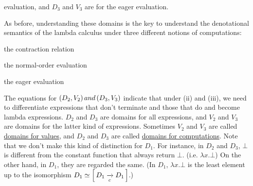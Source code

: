 \begin{enumcirc}
	evaluation, and $D_3$ and $V_3$ are for the eager evaluation.
	\item
	As before, understanding these domains is the key to understand the
	denotational semantics of the lambda calculus under three different notions of
	computations:
	\begin{enumrm}
		\item
		the contraction relation
		\item
		the normal-order evaluation
		\item
		the eager evaluation
	\end{enumrm}
	The equations for $\left( D_2, V_2 \right) and \left( D_3, V_3 \right)$ indicate that under
	(ii) and (iii), we need to differentiate expressions that don't terminate and
	those that do and become lambda expressions.
	$D_2$ and $D_3$ are domains for all expressions, and $V_2$ and $V_3$ are domains
	for the latter kind of expressions.
	Sometimes $V_2$ and $V_3$ are called \ul{domains for values}, and $D_2$ and
	$D_3$ are called \ul{domains for computations}.
	Note that we don't make this kind of distinction for $D_1$.
	For instance, in $D_2$ and $D_3$, $\bot$ is different from the constant
	function that always return $\bot$. (i.e. $\lambda x. \bot$)
	On the other hand, in $D_1$, they are regarded the same.
	(In $D_1$, $\lambda x . \bot$ is the least element up to the isomorphism $D_1
		\simeq \left[ \, D_1 \xrightarrow[c]{} D_1 \, \right]$.)


\end{enumcirc}
